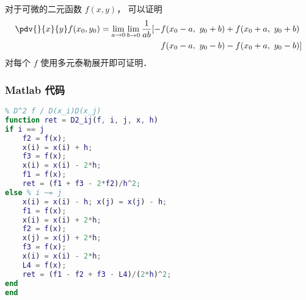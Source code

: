 
\begin{issues}
\issueDraft
\end{issues}


对于可微的二元函数 $f(x,y)$， 可以证明
\begin{equation}
\begin{aligned}
\pdv{}{x}{y} f(x_0,y_0) = \lim_{a\to 0}\lim_{b\to 0}\frac{1}{ab}[-& f(x_0-a,\ y_0+b) + f(x_0+a,\  y_0+b)\\
& f(x_0-a,\  y_0-b) - f(x_0+a,\  y_0-b)]
\end{aligned}
\end{equation}
对每个 $f$ 使用多元泰勒展开即可证明．

\subsubsection{Matlab 代码}
\begin{lstlisting}[language=matlab, caption=D2\_ij.m]
% 数值二阶偏导
% D^2 f / D(x_i)D(x_j)
function ret = D2_ij(f, i, j, x, h)
if i == j
    f2 = f(x);
    x(i) = x(i) + h;
    f3 = f(x);
    x(i) = x(i) - 2*h;
    f1 = f(x);
    ret = (f1 + f3 - 2*f2)/h^2;
else % i ~= j
    x(i) = x(i) - h; x(j) = x(j) - h;
    f1 = f(x);
    x(i) = x(i) + 2*h;
    f2 = f(x);
    x(j) = x(j) + 2*h;
    f3 = f(x);
    x(i) = x(i) - 2*h;
    L4 = f(x);
    ret = (f1 - f2 + f3 - L4)/(2*h)^2;
end
end
\end{lstlisting}
